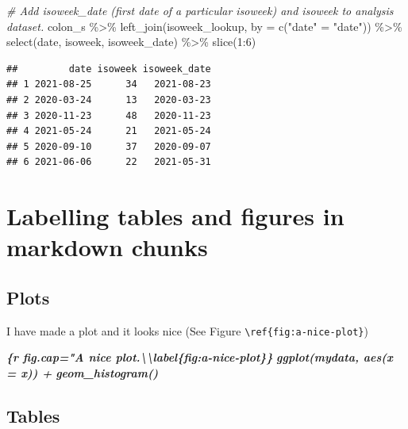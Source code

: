 \documentclass[
]{book}
\newenvironment{Shaded}{\begin{snugshade}}{\end{snugshade}}
\newcommand{\AttributeTok}[1]{\textcolor[rgb]{0.77,0.63,0.00}{#1}}
\newcommand{\CommentTok}[1]{\textcolor[rgb]{0.56,0.35,0.01}{\textit{#1}}}
\newcommand{\DecValTok}[1]{\textcolor[rgb]{0.00,0.00,0.81}{#1}}
\newcommand{\FunctionTok}[1]{\textcolor[rgb]{0.00,0.00,0.00}{#1}}
\newcommand{\InformationTok}[1]{\textcolor[rgb]{0.56,0.35,0.01}{\textbf{\textit{#1}}}}
\newcommand{\NormalTok}[1]{#1}
\newcommand{\OtherTok}[1]{\textcolor[rgb]{0.56,0.35,0.01}{#1}}
\newcommand{\SpecialCharTok}[1]{\textcolor[rgb]{0.00,0.00,0.00}{#1}}
\newcommand{\StringTok}[1]{\textcolor[rgb]{0.31,0.60,0.02}{#1}}
\begin{document}
\begin{Shaded}
\begin{Highlighting}[]
\CommentTok{\# Add isoweek\_date (first date of a particular isoweek) and isoweek to analysis dataset. }
\NormalTok{colon\_s }\SpecialCharTok{\%\textgreater{}\%} 
  \FunctionTok{left\_join}\NormalTok{(isoweek\_lookup, }\AttributeTok{by =} \FunctionTok{c}\NormalTok{(}\StringTok{"date"} \OtherTok{=} \StringTok{"date"}\NormalTok{)) }\SpecialCharTok{\%\textgreater{}\%} 
  \FunctionTok{select}\NormalTok{(date, isoweek, isoweek\_date) }\SpecialCharTok{\%\textgreater{}\%} 
  \FunctionTok{slice}\NormalTok{(}\DecValTok{1}\SpecialCharTok{:}\DecValTok{6}\NormalTok{)}
\end{Highlighting}
\end{Shaded}

\begin{verbatim}
##         date isoweek isoweek_date
## 1 2021-08-25      34   2021-08-23
## 2 2020-03-24      13   2020-03-23
## 3 2020-11-23      48   2020-11-23
## 4 2021-05-24      21   2021-05-24
## 5 2020-09-10      37   2020-09-07
## 6 2021-06-06      22   2021-05-31
\end{verbatim}

\hypertarget{labelling-tables-and-figures-in-markdown-chunks}{%
\section{Labelling tables and figures in markdown chunks}\label{labelling-tables-and-figures-in-markdown-chunks}}

\hypertarget{plots}{%
\subsection{Plots}\label{plots}}

I have made a plot and it looks nice (See Figure \texttt{\textbackslash{}ref\{fig:a-nice-plot\}})

\begin{Shaded}
\begin{Highlighting}[]
\InformationTok{\textasciigrave{}\textasciigrave{}\textasciigrave{}\{r fig.cap="A nice plot.\textbackslash{}\textbackslash{}label\{fig:a{-}nice{-}plot\}\}}
\InformationTok{ggplot(mydata, aes(x = x)) +}
\InformationTok{  geom\_histogram()}
\InformationTok{\textasciigrave{}\textasciigrave{}\textasciigrave{}}
\end{Highlighting}
\end{Shaded}

\hypertarget{tables}{%
\subsection{Tables}\label{tables}}
\end{document}

